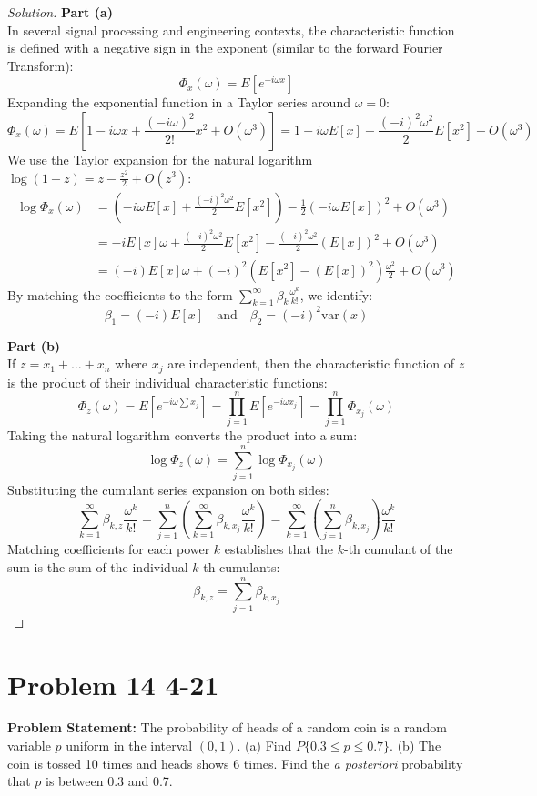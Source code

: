\documentclass{article}
\begin{document}
\begin{proof}[Solution]
	\textbf{Part (a)}\\
	In several signal processing and engineering contexts, the characteristic function is defined with a negative sign in the exponent (similar to the forward Fourier Transform):
	\[ \Phi_x(\omega) = E[e^{-i\omega x}] \]
	Expanding the exponential function in a Taylor series around $\omega=0$:
	\[
		\Phi_x(\omega) = E\left[ 1 - i\omega x + \frac{(-i\omega)^2}{2!} x^2 + O(\omega^3) \right] = 1 - i\omega E[x] + \frac{(-i)^2 \omega^2}{2} E[x^2] + O(\omega^3)
	\]
	We use the Taylor expansion for the natural logarithm $\log(1 + z) = z - \frac{z^2}{2} + O(z^3)$:
	\begin{align*}
		\log \Phi_x(\omega) &= \left( -i\omega E[x] + \frac{(-i)^2 \omega^2}{2} E[x^2] \right) - \frac{1}{2} \left( -i\omega E[x] \right)^2 + O(\omega^3) \\
		&= -i E[x] \omega + \frac{(-i)^2 \omega^2}{2} E[x^2] - \frac{(-i)^2 \omega^2}{2} (E[x])^2 + O(\omega^3) \\
		&= (-i)E[x] \omega + (-i)^2 \left( E[x^2] - (E[x])^2 \right) \frac{\omega^2}{2} + O(\omega^3)
	\end{align*}
	By matching the coefficients to the form $\sum_{k=1}^{\infty} \beta_k \frac{\omega^k}{k!}$, we identify:
	\[
		\beta_1 = (-i)E[x] \quad \text{and} \quad \beta_2 = (-i)^2 \text{var}(x)
	\]
	
	\textbf{Part (b)}\\
	If $z = x_1 + \dots + x_n$ where $x_j$ are independent, then the characteristic function of $z$ is the product of their individual characteristic functions:
	\[
		\Phi_z(\omega) = E[e^{-i\omega \sum x_j}] = \prod_{j=1}^n E[e^{-i\omega x_j}] = \prod_{j=1}^n \Phi_{x_j}(\omega)
	\]
	Taking the natural logarithm converts the product into a sum:
	\[
		\log \Phi_z(\omega) = \sum_{j=1}^n \log \Phi_{x_j}(\omega)
	\]
	Substituting the cumulant series expansion on both sides:
	\[
		\sum_{k=1}^{\infty} \beta_{k,z} \frac{\omega^k}{k!} = \sum_{j=1}^n \left( \sum_{k=1}^{\infty} \beta_{k,x_j} \frac{\omega^k}{k!} \right) = \sum_{k=1}^{\infty} \left( \sum_{j=1}^n \beta_{k,x_j} \right) \frac{\omega^k}{k!}
	\]
	Matching coefficients for each power $k$ establishes that the $k$-th cumulant of the sum is the sum of the individual $k$-th cumulants:
	\[
		\beta_{k,z} = \sum_{j=1}^n \beta_{k,x_j}
	\]
\end{proof}

\section*{Problem 14 4-21}
\textbf{Problem Statement:}
The probability of heads of a random coin is a random variable $p$ uniform in the interval $(0, 1)$.
(a) Find $P\{0.3 \le p \le 0.7\}$.
(b) The coin is tossed 10 times and heads shows 6 times. Find the \textit{a posteriori} probability that $p$ is between 0.3 and 0.7.
\end{document}
